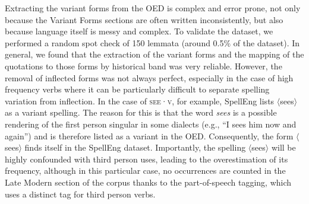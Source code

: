 \documentclass[doc,biblatex]{apa7}
\newcommand\lemma[2]{\textsc{#1·#2}}
\newcommand\spelling[1]{\allowbreak$\langle$#1$\rangle$}
\begin{document}
Extracting the variant forms from the OED is complex and error prone, not only because the Variant Forms sections are often written inconsistently, but also because language itself is messy and complex. To validate the dataset, we performed a random spot check of 150 lemmata (around 0.5\% of the dataset). In general, we found that the extraction of the variant forms and the mapping of the quotations to those forms by historical band was very reliable. However, the removal of inflected forms was not always perfect, especially in the case of high frequency verbs where it can be particularly difficult to separate spelling variation from inflection. In the case of \lemma{see}{v}, for example, SpellEng lists \spelling{sees} as a variant spelling. The reason for this is that the word \textit{sees} is a possible rendering of the first person singular in some dialects (e.g., ``I sees him now and again'') and is therefore listed as a variant in the OED. Consequently, the form \spelling{sees} finds itself in the SpellEng dataset. Importantly, the spelling \spelling{sees} will be highly confounded with third person uses, leading to the overestimation of its frequency, although in this particular case, no occurrences are counted in the Late Modern section of the corpus thanks to the part-of-speech tagging, which uses a distinct tag for third person verbs.
\end{document}
